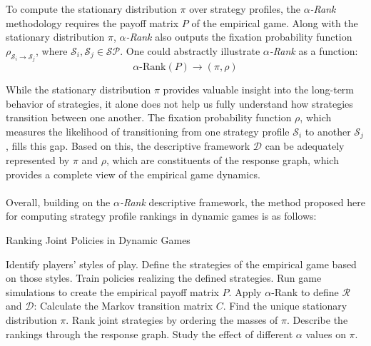 \begin{flushleft}
\begin{flushleft}
        To compute the stationary distribution $\pi$ over strategy profiles, the \emph{$\alpha$-Rank} methodology requires the payoff matrix $P$ of the empirical game. Along with the stationary distribution $\pi$, \emph{$\alpha$-Rank} also outputs the fixation probability function $\rho_{\mathcal{S}_i \to \mathcal{S}_j}$, where $\mathcal{S}_i, \mathcal{S}_j \in \mathcal{SP}$. One could abstractly illustrate \emph{$\alpha$-Rank} as a function:
        \begin{equation}
            \alpha\text{-Rank}(P) \rightarrow (\pi, \rho) 
            \label{eq:abstract_arank}
        \end{equation}

        While the stationary distribution $\pi$ provides valuable insight into the long-term behavior of strategies, it alone does not help us fully understand how strategies transition between one another. The fixation probability function $\rho$, which measures the likelihood of transitioning from one strategy profile $\mathcal{S}_i$ to another $\mathcal{S}_j$, fills this gap. Based on this, the descriptive framework $\mathcal{D}$ can be adequately represented by $\pi$ and $\rho$, which are constituents of the response graph, which provides a complete view of the empirical game dynamics.\\~\\

        Overall, building on the \emph{$\alpha$-Rank} descriptive framework, the method proposed here for computing strategy profile rankings in dynamic games is as follows:
        \begin{algorithm}
            \caption{Ranking Joint Policies in Dynamic Games}
            \begin{algorithmic}[1]
                \vspace{0.5em}
                \State Identify players' styles of play.
                \State Define the strategies of the empirical game based on those styles.
                \State Train policies realizing the defined strategies.
                \State Run game simulations to create the empirical payoff matrix $P$.
                \State Apply $\alpha$-Rank to define $\mathcal{R}$ and $\mathcal{D}$:
                \vspace{0.5em}
                \State \hspace{1em} Calculate the Markov transition matrix $C$.
                \State \hspace{1em} Find the unique stationary distribution $\pi$.
                \State \hspace{1em} Rank joint strategies by ordering the masses of $\pi$.
                \State \hspace{1em} Describe the rankings through the response graph.
                \State \hspace{1em} Study the effect of different $\alpha$ values on $\pi$.
            \end{algorithmic}
        \end{algorithm}

    \end{flushleft}

\end{flushleft}